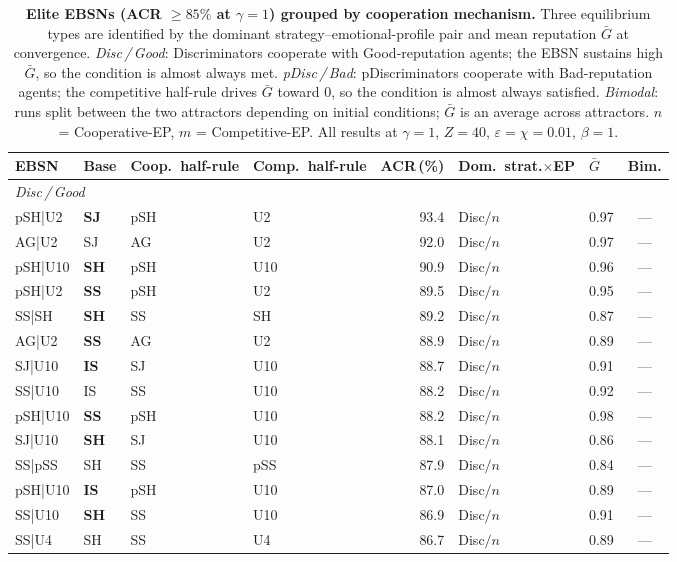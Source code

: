 \begin{table}[!ht]
\centering
\caption{\textbf{Elite EBSNs (ACR $\geq 85\%$ at $\gamma=1$) grouped by cooperation mechanism.} Three equilibrium types are identified by the dominant strategy--emotional-profile pair and mean reputation $\bar{G}$ at convergence. \textit{Disc\,/\,Good}: Discriminators cooperate with Good-reputation agents; the EBSN sustains high $\bar{G}$, so the condition is almost always met. \textit{pDisc\,/\,Bad}: pDiscriminators cooperate with Bad-reputation agents; the competitive half-rule drives $\bar{G}$ toward 0, so the condition is almost always satisfied. \textit{Bimodal}: runs split between the two attractors depending on initial conditions; $\bar{G}$ is an average across attractors. $n$ = Cooperative-EP, $m$ = Competitive-EP. All results at $\gamma=1$, $Z=40$, $\varepsilon=\chi=0.01$, $\beta=1$.}
\label{tab:elite}
\small
\begin{tabular}{@{}llllrllc@{}}
\toprule
EBSN & Base & Coop.\ half-rule & Comp.\ half-rule & ACR\,(\%) & Dom.\ strat.$\times$EP & $\bar{G}$ & Bim. \\
\midrule
\multicolumn{8}{l}{\textit{Disc\,/\,Good}} \\
\midrule
pSH|U2 & \textbf{SJ} & pSH & U2 & 93.4 & Disc$/n$ & 0.97 & --- \\
AG|U2 & SJ & AG & U2 & 92.0 & Disc$/n$ & 0.97 & --- \\
pSH|U10 & \textbf{SH} & pSH & U10 & 90.9 & Disc$/n$ & 0.96 & --- \\
pSH|U2 & \textbf{SS} & pSH & U2 & 89.5 & Disc$/n$ & 0.95 & --- \\
SS|SH & \textbf{SH} & SS & SH & 89.2 & Disc$/n$ & 0.87 & --- \\
AG|U2 & \textbf{SS} & AG & U2 & 88.9 & Disc$/n$ & 0.89 & --- \\
SJ|U10 & \textbf{IS} & SJ & U10 & 88.7 & Disc$/n$ & 0.91 & --- \\
SS|U10 & IS & SS & U10 & 88.2 & Disc$/n$ & 0.92 & --- \\
pSH|U10 & \textbf{SS} & pSH & U10 & 88.2 & Disc$/n$ & 0.98 & --- \\
SJ|U10 & \textbf{SH} & SJ & U10 & 88.1 & Disc$/n$ & 0.86 & --- \\
SS|pSS & SH & SS & pSS & 87.9 & Disc$/n$ & 0.84 & --- \\
pSH|U10 & \textbf{IS} & pSH & U10 & 87.0 & Disc$/n$ & 0.89 & --- \\
SS|U10 & \textbf{SH} & SS & U10 & 86.9 & Disc$/n$ & 0.91 & --- \\
SS|U4 & SH & SS & U4 & 86.7 & Disc$/n$ & 0.89 & --- \\

\end{tabular}
\end{table}
